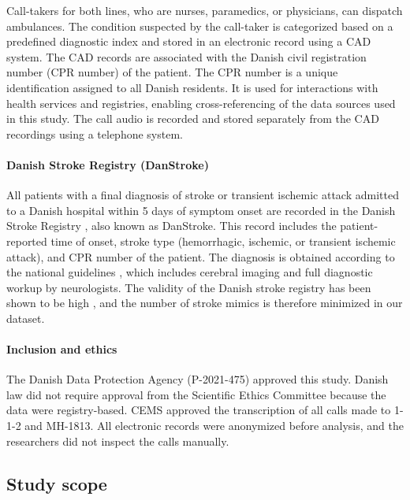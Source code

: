 {Call-takers for both lines, who are nurses, paramedics, or physicians, can dispatch ambulances. The condition suspected by the call-taker is categorized based on a predefined diagnostic index and stored in an electronic record using a CAD system. The CAD records are associated with the Danish civil registration number (CPR number) \parencite{cite19} of the patient. The CPR number is a unique identification assigned to all Danish residents. It is used for interactions with health services and registries, enabling cross-referencing of the data sources used in this study. The call audio is recorded and stored separately from the CAD recordings using a telephone system.

\paragraph{Danish Stroke Registry (DanStroke)}

All patients with a final diagnosis of stroke or transient ischemic attack admitted to a Danish hospital within 5 days of symptom onset are recorded in the Danish Stroke Registry \parencite{cite16}, also known as DanStroke. This record includes the patient-reported time of onset, stroke type (hemorrhagic, ischemic, or transient ischemic attack), and CPR number of the patient.
The diagnosis is obtained according to the national guidelines \parencite{baluenfeldt_national_2021}, which includes cerebral imaging and full diagnostic workup by neurologists. The validity of the Danish stroke registry has been shown to be high \parencite{wildenschild_registration_2013}, and the number of stroke mimics is therefore minimized in our dataset.


\paragraph{Inclusion and ethics}

The Danish Data Protection Agency (P-2021-475) approved this study. Danish law did not require approval from the Scientific Ethics Committee because the data were registry-based. CEMS approved the transcription of all calls made to 1-1-2 and MH-1813. All electronic records were anonymized before analysis, and the researchers did not inspect the calls manually.


\subsection{Study scope}

}
